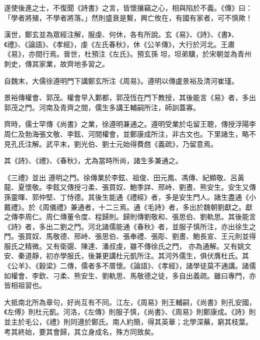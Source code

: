 \begin{pinyinscope}
 遂使後進之士，不復聞《詩書》之言，皆懷攘竊之心，相與陷於不義。《傳》曰：「學者將殖，不學者將落。」然則盛衰是繫，興亡攸在，有國有家者，可不慎歟！



 漢世，鄭玄並為眾經注解，服虔、何休，各有所說。玄《易》、《詩》、《書》、《禮》、《論語》、《孝經》，虔《左氏春秋》，休《公羊傳》，大行於河北。王肅《易》，亦間行焉。晉世，杜預注《左氏》。預玄孫
 坦，坦弟驥，於宋朝並為青州刺史，傳其家業，故齊地多習之。



 自魏末，大儒徐遵明門下講鄭玄所注《周易》。遵明以傳盧景裕及清河崔瑾。



 景裕傳權會、郭茂。權會早入鄴都，郭茂恆在門下教授，其後能言《易》者，多出郭茂之門。河南及青齊之間，儒生多講王輔嗣所注，師訓蓋寡。



 齊時，儒士罕傳《尚書》之業，徐遵明兼通之。遵明受業於屯留王聰，傳授浮陽李周仁及勃海張文敬、李鉉、河間權會，並鄭康成所注，非古文也。下里諸生，略不見孔氏注解。武平末，劉光伯、劉士元始得費甝《義疏》，乃留意焉。



 其《詩》、《禮》、《春秋》，尤為當時所尚，諸生多兼通之。



 《三禮》並出
 遵明之門。徐傳業於李鉉、祖俊、田元鳳、馮傳、紀顯敬、呂黃龍、夏懷敬。李鉉又傳授刁柔、張買奴、鮑季詳、邢峙、劉晝、熊安生。安生又傳孫靈暉、郭仲堅、丁恃德。其後生能通《禮經》者，多是安生門人。諸生盡通《小戴禮》。於《周儀禮》兼通者，十二三焉。通《毛詩》者，多出於魏朝劉獻之。獻之傳李周仁。周仁傳董令度、程歸則。歸則傳劉敬和、張思伯、劉軌思。其後能言《詩》者，多出二劉之門。河北諸儒能通《春秋》者，並服子慎所注，亦出徐生之門。張買奴、馬敬德、邢峙、張思伯、張奉禮、張彫、劉晝、鮑長宣、王元則並得服氏之精微。又有衛覬、陳達、潘叔虔，雖不傳徐氏之門，
 亦為通解。又有姚文安、秦道靜，初亦學服氏，後兼更講杜元凱所注。其河外儒生，俱伏膺杜氏。其《公羊》、《穀梁》二傳，儒者多不厝懷。《論語》、《孝經》，諸學徒莫不通講。諸儒如權會、李欽、刁柔、熊安生、劉軌思、馬敬德之徒，多自出義疏。雖曰專門，亦皆相祖習也。



 大抵南北所為章句，好尚互有不同。江左，《周易》則王輔嗣，《尚書》則孔安國，《左傅》則杜元凱。河洛，《左傳》則服子慎，《尚書》、《周易》則鄭康成。《詩》則並主於毛公，《禮》則同遵於鄭氏。南人約簡，得其英華；北學深蕪，窮其枝葉。考其終始，要其會歸，其立身成名，殊方同致矣。




\end{pinyinscope}
